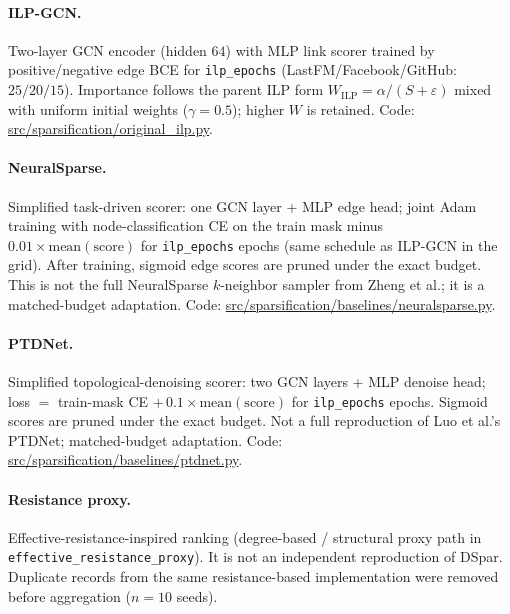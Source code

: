 \documentclass[11pt,a4paper]{article}
\providecommand{\path}[1]{\url{#1}}
\begin{document}
\paragraph{ILP-GCN.}
Two-layer GCN encoder (hidden $64$) with MLP link scorer trained by positive/negative edge BCE for \texttt{ilp\_epochs} (LastFM/Facebook/GitHub: $25/20/15$).
Importance follows the parent ILP form $W_{\mathrm{ILP}}=\alpha/(S+\varepsilon)$ mixed with uniform initial weights ($\gamma{=}0.5$); higher $W$ is retained.
Code: \path{src/sparsification/original_ilp.py}.

\paragraph{NeuralSparse.}
Simplified task-driven scorer: one GCN layer + MLP edge head; joint Adam training with node-classification CE on the train mask minus $0.01\times\mathrm{mean}(\mathrm{score})$ for \texttt{ilp\_epochs} epochs (same schedule as ILP-GCN in the grid).
After training, sigmoid edge scores are pruned under the exact budget.
This is not the full NeuralSparse $k$-neighbor sampler from Zheng et al.; it is a matched-budget adaptation.
Code: \path{src/sparsification/baselines/neuralsparse.py}.

\paragraph{PTDNet.}
Simplified topological-denoising scorer: two GCN layers + MLP denoise head; loss $=$ train-mask CE $+\,0.1\times\mathrm{mean}(\mathrm{score})$ for \texttt{ilp\_epochs} epochs.
Sigmoid scores are pruned under the exact budget.
Not a full reproduction of Luo et al.'s PTDNet; matched-budget adaptation.
Code: \path{src/sparsification/baselines/ptdnet.py}.

\paragraph{Resistance proxy.}
Effective-resistance-inspired ranking (degree-based / structural proxy path in \texttt{effective\_resistance\_proxy}).
It is not an independent reproduction of DSpar.
Duplicate records from the same resistance-based implementation were removed before aggregation ($n{=}10$ seeds).
\end{document}
